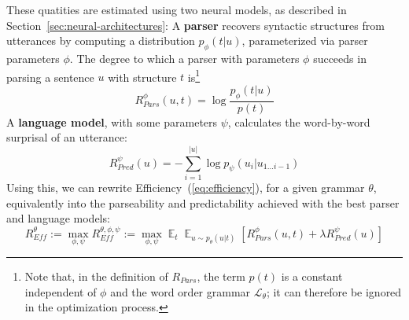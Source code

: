 \documentclass[10pt,twoside,lineno]{article}
\DeclareMathOperator*{\argmax}{arg\,max}
\DeclareMathOperator{\E}{\mathop{\mathbb{E}}}
\newcommand{\key}[1]{\textbf{#1}}
\newcommand{\utterance}{\mathcal{U}}
\newcommand{\tree}{\mathcal{T}}
\begin{document}
These quatities are estimated using two neural models, as described in Section~\ref{sec:neural-architectures}:
A \key{parser} recovers syntactic structures from utterances by computing a distribution $p_\phi(t|u)$, parameterized via parser parameters $\phi$.
The degree to which a parser with parameters $\phi$ succeeds in parsing a sentence $u$ with structure $t$ is\footnote{Note that, in the definition of $R_{Pars}$, the term $p(t)$ is a constant independent of $\phi$ and the word order grammar $\mathcal{L}_\theta$; it can therefore be ignored in the optimization process.} 
\begin{equation}
	R_{Pars}^{\phi}(u,t) =  \log \frac{p_\phi(t|u)}{p(t)}
\end{equation}
%
A \key{language model}, with some parameters $\psi$, calculates the word-by-word surprisal of an utterance:
\begin{equation}
	R_{Pred}^{\psi}(u) = - \sum_{i=1}^{|u|} \log p_\psi(u_i|u_{1\dots i-1})
\end{equation}
Using this, we can rewrite Efficiency~(\ref{eq:efficiency}), for a given grammar $\theta$, equivalently into the parseability and predictability achieved with the best parser and language models:
\begin{equation}
	R_{\textit{Eff}}^{\theta} := \max_{\phi,\psi} R_{\textit{Eff}}^{\theta, \phi, \psi} := \max_{\phi,\psi} \E_t \E_{u \sim p_\theta(u|t)} \left[R_{Pars}^{\phi}(u,t) + \lambda R_{Pred}^{\psi}(u)\right]
\end{equation}
%
%
\end{document}

